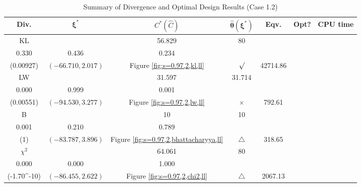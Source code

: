 \documentclass[12pt, a4paper]{article}
\begin{document}
\begin{table}[H]
\centering
\renewcommand{\arraystretch}{1.5} %
\setlength{\tabcolsep}{8pt} %
\begin{tabular}{|c|c|c|c|c|c|c|}
\hline
\textbf{Div.} & \(\boldsymbol{\xi^*}\) & \(C^* (\hat{C})\) & \(\boldsymbol{\hat{\theta}(\xi^*)}\) & \textbf{Eqv.} & \textbf{Opt?} & \textbf{CPU time} \\
\hline
KL & \(\left\{\begin{array}{ccc}
33.557 & 56.829 & 80 \\
0.330 & 0.436 & 0.234
\end{array}\right\}\) &
\(\begin{array}{c}
0.00927 \\
(0.00927)
\end{array}\) & 
\((-66.710, 2.017)\) & 
Figure \ref{fig:s=0.97,2,kl,ll} & $\surd$ & 42714.86 \\
\hline
LW & \(\left\{\begin{array}{ccc}
10 & 31.597 & 31.714 \\
0.000 & 0.999 & 0.001
\end{array}\right\}\) &
\(\begin{array}{c}
0.00551 \\
(0.00551)
\end{array}\) & 
\((-94.530, 3.277)\) & 
Figure \ref{fig:s=0.97,2,lw,ll} & $\times$ & 792.61 \\
\hline
B & \(\left\{\begin{array}{ccc}
10 & 10 & 10 \\
0.001 & 0.210 & 0.789
\end{array}\right\}\) &
\(\begin{array}{c}
1 \\
(1)
\end{array}\) & 
\((-83.787, 3.896)\) & 
Figure \ref{fig:s=0.97,2,bhattacharyya,ll} & $\triangle$ & 318.65 \\
\hline
\(\chi^2\) & \(\left\{\begin{array}{ccc}
49.736 & 64.061 & 80 \\
0.000 & 0.000 & 1.000
\end{array}\right\}\) &
\(\begin{array}{c}
0.0339 \\
(-1.70\times 10^{-10})
\end{array}\) & 
\((-86.455, 2.622)\) & 
Figure \ref{fig:s=0.97,2,chi2,ll} & $\triangle$ & 2067.13 \\
\hline
\end{tabular}
\caption{Summary of Divergence and Optimal Design Results (Case 1.2)}
\label{tab:results1.2}
\end{table}
\end{document}
